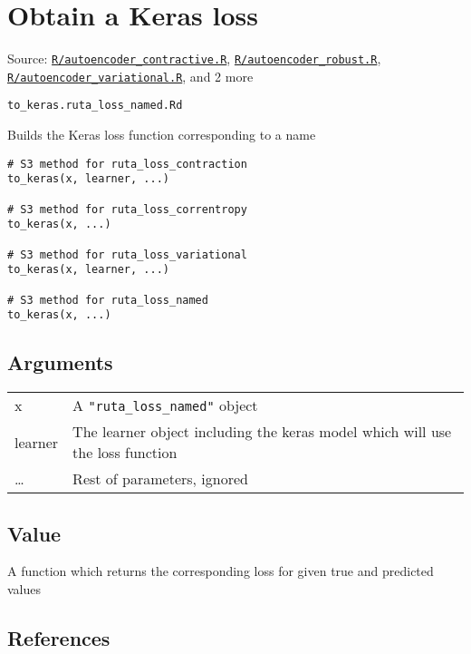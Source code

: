 \section{Obtain a Keras loss}\label{obtain-a-keras-loss}

Source:
\href{https://github.com/fdavidcl/ruta/blob/master/R/autoencoder_contractive.R}{\texttt{R/autoencoder\_contractive.R}},
\href{https://github.com/fdavidcl/ruta/blob/master/R/autoencoder_robust.R}{\texttt{R/autoencoder\_robust.R}},
\href{https://github.com/fdavidcl/ruta/blob/master/R/autoencoder_variational.R}{\texttt{R/autoencoder\_variational.R}},
and 2 more

\texttt{to\_keras.ruta\_loss\_named.Rd}

Builds the Keras loss function corresponding to a name

\begin{verbatim}
# S3 method for ruta_loss_contraction
to_keras(x, learner, ...)

# S3 method for ruta_loss_correntropy
to_keras(x, ...)

# S3 method for ruta_loss_variational
to_keras(x, learner, ...)

# S3 method for ruta_loss_named
to_keras(x, ...)
\end{verbatim}

\hypertarget{arguments}{\subsection{\texorpdfstring{\protect\hyperlink{arguments}{}Arguments}{Arguments}}\label{arguments}}

\begin{longtable}[c]{@{}ll@{}}
\toprule
x & A \texttt{"ruta\_loss\_named"} object\tabularnewline
learner & The learner object including the keras model which will use
the loss function\tabularnewline
\ldots{} & Rest of parameters, ignored\tabularnewline
\bottomrule
\end{longtable}

\hypertarget{value}{\subsection{\texorpdfstring{\protect\hyperlink{value}{}Value}{Value}}\label{value}}

A function which returns the corresponding loss for given true and
predicted values

\hypertarget{references}{\subsection{\texorpdfstring{\protect\hyperlink{references}{}References}{References}}\label{references}}

